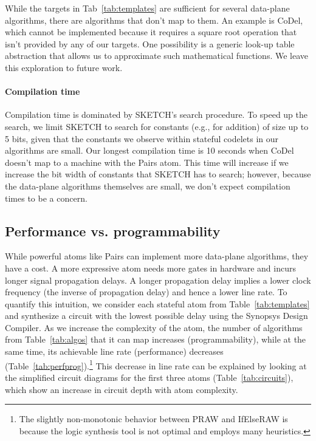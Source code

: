 While the targets in Tab~\ref{tab:templates} are sufficient for several
data-plane algorithms, there are algorithms that don't map to them. An example
is CoDel, which cannot be implemented because it requires a square root
operation that isn't provided by any of our targets. One possibility is a
generic look-up table abstraction that allows us to approximate such
mathematical functions. We leave this exploration to future work.
\paragraph{Compilation time}
Compilation time is dominated by SKETCH's search procedure.  To speed up the
search, we limit SKETCH to search for constants (e.g., for addition) of size up
to 5 bits, given that the constants we observe within stateful codelets in our
algorithms are small. Our longest compilation time is 10 seconds when CoDel
doesn't map to a \absmachine machine with the Pairs atom.  This time will
increase if we increase the bit width of constants that SKETCH has to search;
however, because the data-plane algorithms themselves are small, we don't
expect compilation times to be a concern.

\subsection{Performance vs. programmability}
\label{ss:perfprog}
While powerful atoms like Pairs can implement more data-plane algorithms, they
have a cost.  A more expressive atom needs more gates in hardware and incurs
longer signal propagation delays. A longer propagation delay implies a lower
clock frequency (the inverse of propagation delay) and hence a lower line rate.
To quantify this intuition, we consider each stateful atom from
Table~\ref{tab:templates} and synthesize a circuit with the lowest possible
delay using the Synopsys Design Compiler. As we increase the complexity of the
atom, the number of algorithms from Table~\ref{tab:algos} that it can map
increases (programmability), while at the same time, its achievable line rate
(performance) decreases (Table~\ref{tab:perfprog}).\footnote{The slightly
non-monotonic behavior between PRAW and IfElseRAW is because the logic
synthesis tool is not optimal and employs many heuristics.} This decrease in
line rate can be explained by looking at the simplified circuit diagrams for
the first three atoms (Table~\ref{tab:circuits}), which show an increase in
circuit depth with atom complexity.

